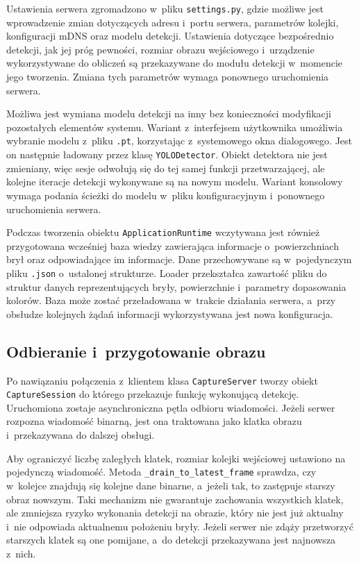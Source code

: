 Ustawienia serwera zgromadzono w~pliku \texttt{settings.py}, gdzie możliwe jest wprowadzenie zmian dotyczących adresu i~portu serwera, parametrów kolejki, konfiguracji mDNS oraz modelu detekcji. Ustawienia dotyczące bezpośrednio detekcji, jak jej próg pewności, rozmiar obrazu wejściowego i~urządzenie wykorzystywane do obliczeń są przekazywane do modułu detekcji w~momencie jego tworzenia. Zmiana tych parametrów wymaga ponownego uruchomienia serwera.

Możliwa jest wymiana modelu detekcji na inny bez konieczności modyfikacji pozostałych elementów systemu. Wariant z~interfejsem użytkownika umożliwia wybranie modelu z~pliku \texttt{.pt}, korzystając z~systemowego okna dialogowego. Jest on następnie ładowany przez klasę \texttt{YOLODetector}. Obiekt detektora nie jest zmieniany, więc sesje odwołują się do tej samej funkcji przetwarzającej, ale kolejne iteracje detekcji wykonywane są na nowym modelu. Wariant konsolowy wymaga podania ścieżki do modelu w~pliku konfiguracyjnym i~ponownego uruchomienia serwera.

Podczas tworzenia obiektu \texttt{ApplicationRuntime} wczytywana jest również przygotowana wcześniej baza wiedzy zawierająca informacje o~powierzchniach brył oraz odpowiadające im informacje. Dane przechowywane są w~pojedynczym pliku \texttt{.json} o~ustalonej strukturze. Loader przekształca zawartość pliku do struktur danych reprezentujących bryły, powierzchnie i~parametry dopasowania kolorów. Baza może zostać przeładowana w~trakcie działania serwera, a~przy obsłudze kolejnych żądań informacji wykorzystywana jest nowa konfiguracja.

\subsection{Odbieranie i~przygotowanie obrazu}
\label{ssec:odb_prz_obrazu}

Po nawiązaniu połączenia z~klientem klasa \texttt{CaptureServer} tworzy obiekt \texttt{CaptureSession} do którego przekazuje funkcję wykonującą detekcję. Uruchomiona zostaje asynchroniczna pętla odbioru wiadomości. Jeżeli serwer rozpozna wiadomość binarną, jest ona traktowana jako klatka obrazu i~przekazywana do dalszej obsługi.

Aby ograniczyć liczbę zaległych klatek, rozmiar kolejki wejściowej ustawiono na pojedynczą wiadomość. Metoda \texttt{\_drain\_to\_latest\_frame} sprawdza, czy w~kolejce znajdują się kolejne dane binarne, a~jeżeli tak, to zastępuje starszy obraz nowszym. Taki mechanizm nie gwarantuje zachowania wszystkich klatek, ale zmniejsza ryzyko wykonania detekcji na obrazie, który nie jest już aktualny i~nie odpowiada aktualnemu położeniu bryły. Jeżeli serwer nie zdąży przetworzyć starszych klatek są one pomijane, a~do detekcji przekazywana jest najnowsza z~nich.

